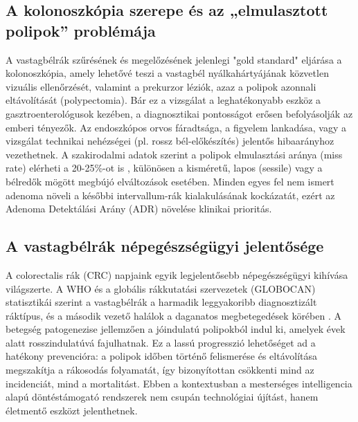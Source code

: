 \documentclass[12pt, a4paper]{report}
\begin{document}
\subsection{A kolonoszkópia szerepe és az „elmulasztott polipok” problémája}
A vastagbélrák szűrésének és megelőzésének jelenlegi "gold standard" eljárása a kolonoszkópia, amely lehetővé teszi a vastagbél nyálkahártyájának közvetlen vizuális ellenőrzését, valamint a prekurzor léziók, azaz a polipok azonnali eltávolítását (polypectomia). Bár ez a vizsgálat a leghatékonyabb eszköz a gasztroenterológusok kezében, a diagnosztikai pontosságot erősen befolyásolják az emberi tényezők. Az endoszkópos orvos fáradtsága, a figyelem lankadása, vagy a vizsgálat technikai nehézségei (pl. rossz bél-előkészítés) jelentős hibaarányhoz vezethetnek. A szakirodalmi adatok szerint a polipok elmulasztási aránya (miss rate) elérheti a 20-25\%-ot is \cite{leufkens2012factors}, különösen a kisméretű, lapos (sessile) vagy a bélredők mögött megbújó elváltozások esetében. Minden egyes fel nem ismert adenoma növeli a későbbi intervallum-rák kialakulásának kockázatát, ezért az Adenoma Detektálási Arány (ADR) növelése klinikai prioritás.

\subsection{A vastagbélrák népegészségügyi jelentősége}
A colorectalis rák (CRC) napjaink egyik legjelentősebb népegészségügyi kihívása világszerte. A WHO és a globális rákkutatási szervezetek (GLOBOCAN) statisztikái szerint a vastagbélrák a harmadik leggyakoribb diagnosztizált ráktípus, és a második vezető halálok a daganatos megbetegedések körében \cite{who_cancer}. A betegség patogenezise jellemzően a jóindulatú polipokból indul ki, amelyek évek alatt rosszindulatúvá fajulhatnak. Ez a lassú progresszió lehetőséget ad a hatékony prevencióra: a polipok időben történő felismerése és eltávolítása megszakítja a rákosodás folyamatát, így bizonyítottan csökkenti mind az incidenciát, mind a mortalitást. Ebben a kontextusban a mesterséges intelligencia alapú döntéstámogató rendszerek nem csupán technológiai újítást, hanem életmentő eszközt jelenthetnek.
\end{document}

